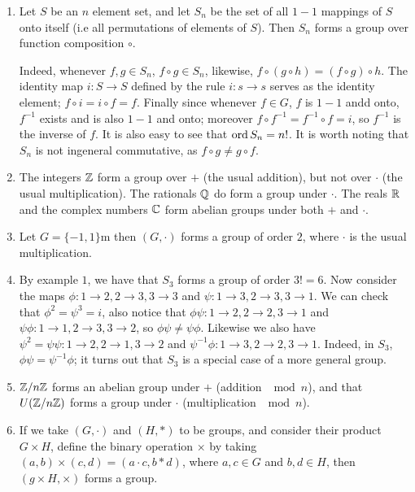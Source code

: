 \begin{example}
    \begin{enumerate}[label=(\arabic*)]
        \item Let $S$ be an  $n$ element set, and let  $S_n$ be the set of all  $1-1$ mappings of
            $S$ onto itself  (i.e all permutations of elements of $S$). Then $S_n$ forms a group
            over function composition $\circ$.

            Indeed, whenever  $f,g \in S_n$,  $f \circ g \in S_n$, likewise,  $f \circ (g \circ
            h)=(f \circ g) \circ h$. The identity map $i:S \rightarrow S$ defined by the rule  $i:s
            \rightarrow s$ serves as the identity element;  $f \circ i=i \circ f=f$. Finally since
            whenever $f \in G$,  $f$ is  $1-1$ andd onto,  $f^{-1}$ exists and is also $1-1$ and
            onto; moreover  $f \circ f^{-1}=f^{-1} \circ f=i$, so $f^{-1}$ is the inverse of $f$. It
            is also easy to see that  $\operatorname{ord}{S_n}=n!$. It is worth noting that $S_n$ is not ingeneral
            commutative, as  $f \circ g \neq g \circ f$.

        \item The integers $\mathbb{Z}$ form a group over  $+$  (the usual addition), but not over $\cdot$
            (the usual multiplication). The rationals $\mathbb{Q}$ do form a group under  $\cdot$. The reals
             $\mathbb{R}$ and the complex numbers $\mathbb{C}$ form abelian groups under both  $+$ and  $\cdot$.

         \item Let  $G=\{-1,1\}$m then $(G,\cdot)$ forms a group of order $2$, where  $\cdot$ is the
             usual multiplication.

         \item By example  $1$, we have that  $S_3$ forms a group of order  $3!=6$. Now consider the
             maps  $\phi:1 \rightarrow 2, 2 \rightarrow 3, 3 \rightarrow 3$ and $\psi:1 \rightarrow
             3, 2 \rightarrow 3, 3 \rightarrow 1$. We can check that  $\phi^2=\psi^3=i$, also notice
             that  $\phi\psi:1 \rightarrow 2, 2 \rightarrow 2, 3 \rightarrow 1$ and 
             $\psi\phi:1 \rightarrow 1, 2 \rightarrow 3, 3 \rightarrow 2$, so $\phi\psi \neq
             \psi\phi$. Likewise we also have  $\psi^2=\psi\psi: 1 \rightarrow 2, 2 \rightarrow 1, 3
             \rightarrow 2$ and $\psi^{-1}\phi: 1 \rightarrow 3, 2 \rightarrow 2, 3
             \rightarrow 1$. Indeed, in $ S_3$, $\phi\psi=\psi^{-1}\phi$; it turns out that $S_3$ is
             a special case of a more general group.

         \item  $\mathbb{Z}/n\mathbb{Z}$ forms an abelian group under  $+$  (addition $\mod{n}$), and that
             $U(\mathbb{Z}/n\mathbb{Z})$ forms a group under $\cdot$  (multiplication $\mod{n}$).

         \item If we take $(G,\cdot)$ and $(H,*)$ to be groups, and consider their product $G \times
             H$, define the binary operation  $\times$ by taking  $(a,b) \times (c,d)=(a \cdot c,
             b*d)$, where $a,c \in G$ and  $b,d \in H$, then  $(g \times H, \times)$ forms a group.
    \end{enumerate}		
\end{example} 


